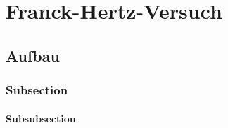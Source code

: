 \chapter{Franck-Hertz-Versuch}

\section{Aufbau}
\subsection{Subsection}
\subsubsection{Subsubsection}
